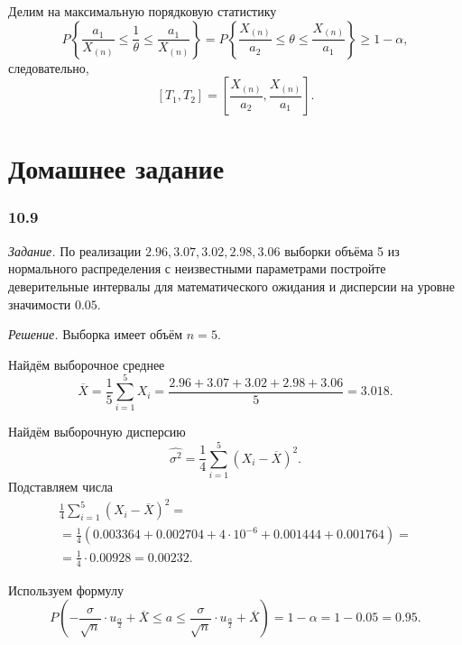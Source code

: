 \begin{enumerate}[label=\alph*)]
  Делим на максимальную порядковую статистику
  $$P \left\{
      \frac{a_1}{X_{ \left( n \right) }} \leq \frac{1}{ \theta } \leq
      \frac{a_1}{X_{ \left( n \right) }}
    \right\} =
    P \left\{
      \frac{X_{ \left( n \right) }}{a_2} \leq \theta \leq \frac{X_{ \left( n \right) }}{a_1}
    \right\} \geq
    1 - \alpha,$$
  следовательно,
  $$ \left[ T_1, T_2 \right] =
    \left[ \frac{X_{ \left( n \right) }}{a_2}, \frac{X_{ \left( n \right) }}{a_1} \right].$$
\end{enumerate}

\section*{Домашнее задание}

\subsubsection*{10.9}

\textit{Задание.}
По реализации $2.96, 3.07, 3.02, 2.98, 3.06$
выборки объёма 5 из нормального распределения
с неизвестными параметрами постройте деверительные
интервалы для математического ожидания и дисперсии на уровне значимости $0.05$.

\textit{Решение.} Выборка имеет объём $n = 5$.

Найдём выборочное среднее
$$ \overline{X} =
  \frac{1}{5} \sum \limits_{i = 1}^5 X_i =
  \frac{2.96 + 3.07 + 3.02 + 2.98 + 3.06}{5} =
  3.018.$$

Найдём выборочную дисперсию
$$ \hat{ \sigma^2} =
  \frac{1}{4} \sum \limits_{i = 1}^5 \left( X_i - \overline{X} \right)^2.$$
Подставляем числа
\begin{equation*}
  \begin{split}
    \frac{1}{4} \sum \limits_{i = 1}^5 \left( X_i - \overline{X} \right)^2 = \\
    = \frac{1}{4} \left( 0.003364 + 0.002704 + 4 \cdot 10^{-6} + 0.001444 + 0.001764 \right) = \\
    = \frac{1}{4} \cdot 0.00928 =
    0.00232.
  \end{split}
\end{equation*}

Используем формулу
$$P \left(
    - \frac{ \sigma }{ \sqrt{n}} \cdot u_{ \frac{ \alpha }{2}} + \overline{X} \leq a \leq
    \frac{ \sigma }{ \sqrt{n}} \cdot u_{ \frac{ \alpha }{2}} + \overline{X}
  \right) =
  1 - \alpha =
  1 - 0.05 =
  0.95.$$

